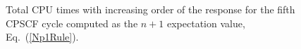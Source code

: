 \documentclass[prl,twocolumn,showpacs,twocolumngrid,superbib]{revtex4}
\begin{document}
{\begin{figure}[h]
  \caption{Total CPU times with increasing order of the response for 
           the fifth CPSCF cycle computed as the $n+1$ expectation value, Eq.~(\ref{Np1Rule}).}\label{TimeWithOrder}
\end{figure}

}
\end{document}
